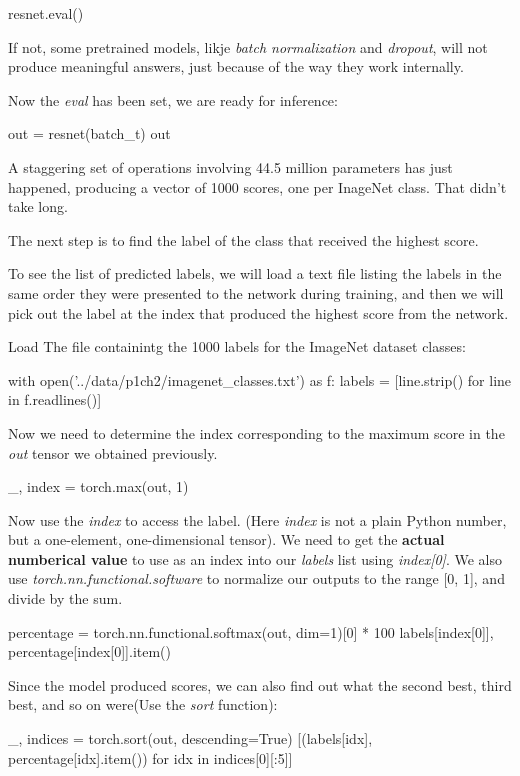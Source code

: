 \begin{python}
resnet.eval()
\end{python}

If not, some pretrained models, likje \textsl{batch normalization} and \textsl{dropout},  will not produce meaningful answers, just because of the way they work internally.

Now the \textsl{eval} has been set, we are ready for inference:

\begin{python}
out = resnet(batch_t)
out
\end{python}

A staggering set of operations involving 44.5 million parameters has just happened, producing a vector of 1000 scores, one per InageNet class. That didn't take long.

The next step is to find the label of the class that received the highest score.

To see the list of predicted labels, we will load a text file listing the labels in the same order they were presented to the network during training, and then we will pick out the label at the index that produced the highest score from the network.

Load The file containintg the 1000 labels for the ImageNet dataset classes:

\begin{python}
with open('../data/p1ch2/imagenet_classes.txt') as f:
    labels = [line.strip() for line in f.readlines()]
\end{python}

Now we need to determine the index corresponding to the maximum score in the \textsl{out} tensor we obtained previously.

\begin{python}
_, index = torch.max(out, 1)
\end{python}

Now use the \textsl{index} to access the label. (Here \textsl{index} is not a plain Python number, but a one-element, one-dimensional tensor). We need to get the \textbf{actual numberical value} to use as an index into our \textsl{labels} list using \textsl{index[0]}. We also use \textsl{torch.nn.functional.software} to normalize our outputs to the range [0, 1], and divide by the sum.

\begin{python}
percentage = torch.nn.functional.softmax(out, dim=1)[0] * 100
labels[index[0]], percentage[index[0]].item()
\end{python}

Since the model produced scores, we can also find out what the second best, third best, and so on were(Use the \textsl{sort} function):

\begin{python}
_, indices = torch.sort(out, descending=True)
[(labels[idx], percentage[idx].item()) for idx in indices[0][:5]]
\end{python}





